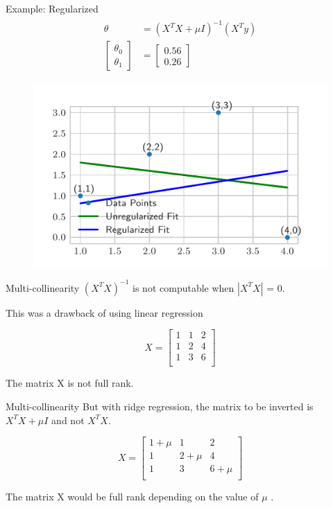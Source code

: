 \documentclass{beamer}
\begin{document}
\begin{frame}{Example: Regularized}
\vspace{0.4cm}
\begin{align*}
\begin{split}
\theta &= (X^{T}X+\mu I)^{-1}(X^{T}y) \\
\begin{bmatrix}
\theta_{0}\\
\theta_{1}
\end{bmatrix} &= 
\begin{bmatrix}
0.56\\
0.26
\end{bmatrix} 
\end{split}
\end{align*}
\vspace{-0.8cm}
\begin{figure}
\includegraphics[width=0.8\linewidth]{ridge/q_reg.pdf}
\end{figure}
\end{frame}

\begin{frame}{Multi-collinearity}
$(X^{T}X)^{-1}$ is not computable when $|X^{T}X|$ = 0.

This was a drawback of using linear regression

\begin{equation*}
X = \begin{bmatrix}
1 & 1& 2\\
1 & 2& 4\\
1 & 3& 6\\
\end{bmatrix}
\end{equation*}

The matrix X is not full rank. 
\end{frame}

\begin{frame}{Multi-collinearity}
But with ridge regression, the matrix to be inverted is $X^{T}X + \mu I$ and not $X^{T}X$.

\begin{equation*}
X = \begin{bmatrix}
1+\mu & 1& 2\\
1 & 2+\mu & 4\\
1 & 3& 6+\mu \\
\end{bmatrix}
\end{equation*}

The matrix X would be full rank depending on the value of $\mu$ . 
\end{frame}
\end{document}

